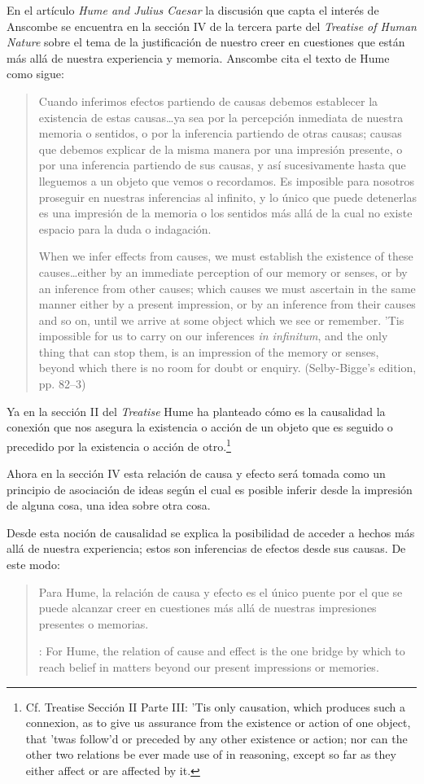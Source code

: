 En el artículo \emph{Hume and Julius Caesar} la discusión que capta el interés
de Anscombe se encuentra en la sección IV de la tercera parte del \emph{Treatise
  of Human Nature} sobre el tema de la justificación de nuestro creer en
cuestiones que están más allá de nuestra experiencia y memoria. Anscombe cita el
texto de Hume como sigue:

\blockquote[{\cite[86]{anscombe1981hjc}}When we infer effects from causes, we
must establish the existence of these causes\ldots either by an immediate
perception of our memory or senses, or by an inference from other causes; which
causes we must ascertain in the same manner either by a present impression, or
by an inference from their causes and so on, until we arrive at some object
which we see or remember. 'Tis impossible for us to carry on our inferences
\emph{in infinitum}, and the only thing that can stop them, is an impression of
the memory or senses, beyond which there is no room for doubt or enquiry.
(Selby-Bigge's edition, pp. 82--3)]{Cuando inferimos efectos partiendo de causas
  debemos establecer la existencia de estas causas\ldots ya sea por la
  percepción inmediata de nuestra memoria o sentidos, o por la inferencia
  partiendo de otras causas; causas que debemos explicar de la misma manera por
  una impresión presente, o por una inferencia partiendo de sus causas, y así
  sucesivamente hasta que lleguemos a un objeto que vemos o recordamos. Es
  imposible para nosotros proseguir en nuestras inferencias al infinito, y lo
  único que puede detenerlas es una impresión de la memoria o los sentidos más
  allá de la cual no existe espacio para la duda o indagación.}

Ya en la sección II del \emph{Treatise} Hume ha planteado cómo es la causalidad
la conexión que nos asegura la existencia o acción de un objeto que es seguido o
precedido por la existencia o acción de otro.\footnote{Cf. Treatise Sección II
  Parte III: ’Tis only causation, which produces such a connexion, as to give us
  assurance from the existence or action of one object, that ’twas follow’d or
  preceded by any other existence or action; nor can the other two relations be
  ever made use of in reasoning, except so far as they either affect or are
  affected by it. }

Ahora en la sección IV esta relación de causa y efecto será tomada como un
principio de asociación de ideas según el cual es posible inferir desde la
impresión de alguna cosa, una idea sobre otra cosa.

Desde esta noción de causalidad se explica la posibilidad de acceder a hechos
más allá de nuestra experiencia; estos son inferencias de efectos desde sus
causas. De este modo: \blockquote[{\cite[87]{anscombe1981hjc}}: For Hume, the
relation of cause and effect is the one bridge by which to reach belief in
matters beyond our present impressions or memories.]{Para Hume, la relación de
  causa y efecto es el único puente por el que se puede alcanzar creer en
  cuestiones más allá de nuestras impresiones presentes o memorias.}

